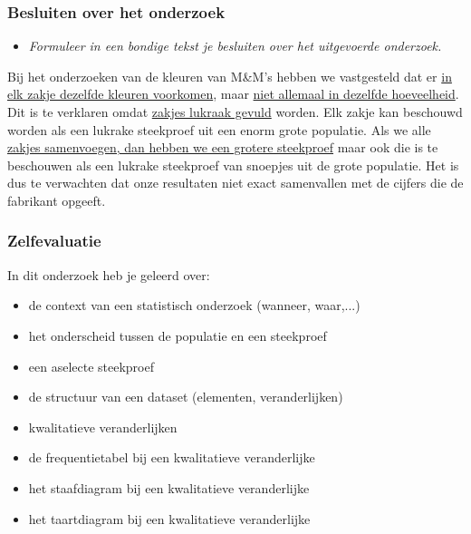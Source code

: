 \documentclass[dutch]{beamer}
\newcommand{\vraag}[1]{\begin{itemize}\item {\it #1}\end{itemize}}
\begin{document}
\begin{frame}
\frametitle{Besluiten over het onderzoek}
\vraag{Formuleer in een bondige tekst je besluiten over het uitgevoerde onderzoek.}
\pause
Bij het onderzoeken van de kleuren van M\&M’s hebben we vastgesteld dat er \uline{in elk zakje
dezelfde kleuren voorkomen}, maar \uline{niet allemaal in dezelfde hoeveelheid}. Dit is te verklaren
omdat \uline{zakjes lukraak gevuld} worden. Elk zakje kan beschouwd worden als een lukrake
steekproef uit een enorm grote populatie. Als we alle \uline{zakjes samenvoegen, dan hebben we
een grotere steekproef} maar ook die is te beschouwen als een lukrake steekproef van snoepjes
uit de grote populatie. Het is dus te verwachten dat onze resultaten niet exact samenvallen
met de cijfers die de fabrikant opgeeft.
\end{frame}

\begin{frame}
\frametitle{Zelfevaluatie}
In dit onderzoek heb je geleerd over:\\
\begin{itemize}
  \item de context van een statistisch onderzoek (wanneer, waar,...)
  \item het onderscheid tussen de populatie en een steekproef
  \item een aselecte steekproef
  \item de structuur van een dataset (elementen, veranderlijken)
  \item kwalitatieve veranderlijken
  \item de frequentietabel bij een kwalitatieve veranderlijke
  \item het staafdiagram bij een kwalitatieve veranderlijke
  \item het taartdiagram bij een kwalitatieve veranderlijke
\end{itemize}
\end{frame}
\end{document}
